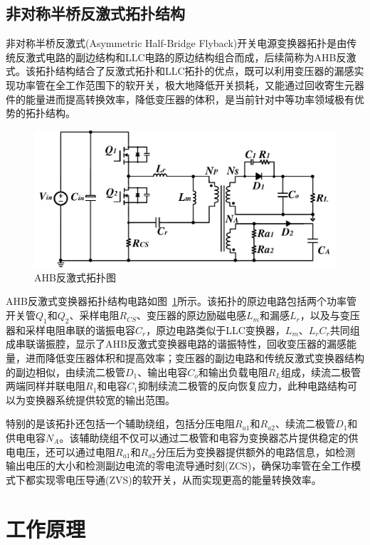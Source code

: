 \subsection{非对称半桥反激式拓扑结构}

非对称半桥反激式(Asymmetric Half-Bridge Flyback)开关电源变换器拓扑是由传统反激式电路的副边结构和LLC电路的原边结构组合而成，后续简称为AHB反激式。该拓扑结构结合了反激式拓扑和LLC拓扑的优点，既可以利用变压器的漏感实现功率管在全工作范围下的软开关，极大地降低开关损耗，又能通过回收寄生元器件的能量进而提高转换效率，降低变压器的体积，是当前针对中等功率领域极有优势的拓扑结构。

\begin{figure}[htbp] 
    \centering
    \includegraphics[width=0.8\linewidth]{figures/AHB拓扑图.pdf}
    \caption{AHB反激式拓扑图}
    \label{fig:AHB拓扑图}
\end{figure}

AHB反激式变换器拓扑结构电路如图~\ref{fig:AHB拓扑图}所示。该拓扑的原边电路包括两个功率管开关管$Q_1$和$Q_2$、采样电阻$R_{CS}$、变压器的原边励磁电感$L_m$和漏感$L_r$，以及与变压器和采样电阻串联的谐振电容$C_r$，原边电路类似于LLC变换器，$L_m$、$L_r$$C_r$共同组成串联谐振腔，显示了AHB反激式变换器电路的谐振特性，回收变压器的漏感能量，进而降低变压器体积和提高效率；变压器的副边电路和传统反激式变换器结构的副边相似，由续流二极管$D_1$、输出电容$C_o$和输出负载电阻$R_L$组成，续流二极管两端同样并联电阻$R_1$和电容$C_1$抑制续流二极管的反向恢复应力，此种电路结构可以为变换器系统提供较宽的输出范围。

特别的是该拓扑还包括一个辅助绕组，包括分压电阻$R_{a1}$和$R_{a2}$、续流二极管$D_1$和供电电容$N_A$。该辅助绕组不仅可以通过二极管和电容为变换器芯片提供稳定的供电电压，还可以通过电阻$R_{a1}$和$R_{a2}$分压后为变换器提供额外的电路信息，如检测输出电压的大小和检测副边电流的零电流导通时刻(ZCS)，确保功率管在全工作模式下都实现零电压导通(ZVS)的软开关，从而实现更高的能量转换效率。




\section{工作原理}

